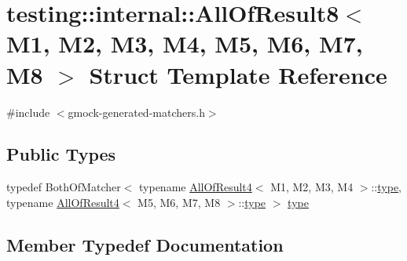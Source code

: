 \hypertarget{structtesting_1_1internal_1_1AllOfResult8}{}\section{testing\+::internal\+::All\+Of\+Result8$<$ M1, M2, M3, M4, M5, M6, M7, M8 $>$ Struct Template Reference}
\label{structtesting_1_1internal_1_1AllOfResult8}


{\ttfamily \#include $<$gmock-\/generated-\/matchers.\+h$>$}

\subsection*{Public Types}
\begin{DoxyCompactItemize}
\item 
typedef Both\+Of\+Matcher$<$ typename \mbox{\hyperlink{structtesting_1_1internal_1_1AllOfResult4}{All\+Of\+Result4}}$<$ M1, M2, M3, M4 $>$\+::\mbox{\hyperlink{structtesting_1_1internal_1_1AllOfResult8_a7103892a28c35221b9e62e871c577727}{type}}, typename \mbox{\hyperlink{structtesting_1_1internal_1_1AllOfResult4}{All\+Of\+Result4}}$<$ M5, M6, M7, M8 $>$\+::\mbox{\hyperlink{structtesting_1_1internal_1_1AllOfResult8_a7103892a28c35221b9e62e871c577727}{type}} $>$ \mbox{\hyperlink{structtesting_1_1internal_1_1AllOfResult8_a7103892a28c35221b9e62e871c577727}{type}}
\end{DoxyCompactItemize}


\subsection{Member Typedef Documentation}
\mbox{\label{structtesting_1_1internal_1_1AllOfResult8_a7103892a28c35221b9e62e871c577727}} 
